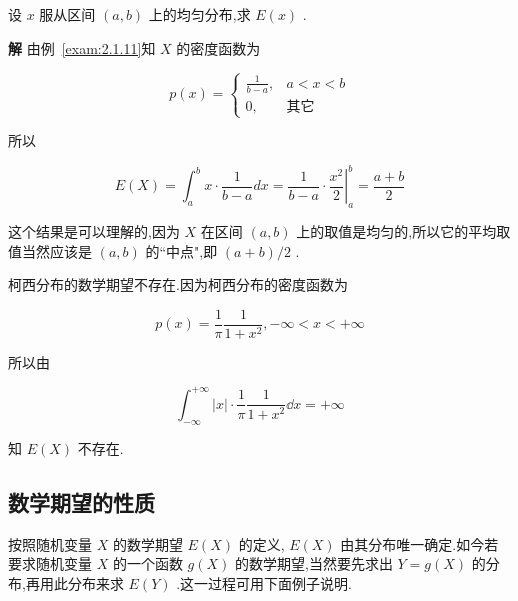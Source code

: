 \begin{example}\label{exam:2.2.4}
	设 $ x $ 服从区间 $ (a,b) $ 上的均匀分布,求 $ E(x) $ .
	
	\textbf{解} 由例~\ref{exam:2.1.11}知 $ X $ 的密度函数为
	
	\[ 
	p(x)=\left\{\begin{array}{ll}
	{\frac{1}{b-a}, }&{a<x<b} \\ {0,}&{\text{其它}}
	\end{array}\right.
	\]
	
	所以
	
	\[ 
	E(X)=\int_{a}^{b} x \cdot \frac{1}{b-a} d x=\frac{1}{b-a} \cdot\left.\frac{x^{2}}{2}\right|_{a} ^{b}=\frac{a+b}{2}
	\]
	
	这个结果是可以理解的,因为 $ X $ 在区间 $ (a,b) $ 上的取值是均匀的,所以它的平均取值当然应该是 $ (a,b) $ 的``中点",即 $ (a+b)/2 $ .
	
	
\end{example}

\begin{example}\label{exam:2.2.5}
	柯西分布的数学期望不存在.因为柯西分布的密度函数为
	
	\[ 
	p(x)=\frac{1}{\pi} \frac{1}{1+x^{2}},-\infty<x<+\infty
	\]
	
	所以由
	
	\[ 
	\int_{-\infty}^{+\infty}|x| \cdot \frac{1}{\pi} \frac{1}{1+x^{2}} \dd x=+\infty
	\]
	
	知 $ E(X) $ 不存在.
	
\end{example}

\subsection{数学期望的性质}\label{ssec:2.2.3}

按照随机变量 $ X $ 的数学期望 $ E(X) $ 的定义, $ E(X) $ 由其分布唯一确定.如今若要求随机变量 $ X $ 的一个函数 $ g(X) $ 的数学期望,当然要先求出 $ Y=g(X) $ 的分布,再用此分布来求 $ E(Y ) $ .这一过程可用下面例子说明.

